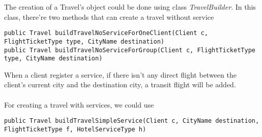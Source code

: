 The creation of a Travel's object could be done using class \textit{TravelBuilder}. In this class, there're two methods that can create a travel without service

\begin{lstlisting}
public Travel buildTravelNoServiceForOneClient(Client c, FlightTicketType type, CityName destination)
public Travel buildTravelNoServiceForGroup(Client c, FlightTicketType type, CityName destination)
\end{lstlisting}

When a client register a service, if there isn't any direct flight between the client's current city and the destination city, a transit flight will be added.  

\paragraph{}
For creating a travel with services, we could use

\begin{lstlisting}
public Travel buildTravelSimpleService(Client c, CityName destination, FlightTicketType f, HotelServiceType h)
\end{lstlisting}
